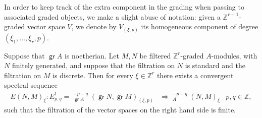 \documentclass[11pt,fleqn]{article}
\newcommand\ZZ{\mathbb Z}
\DeclareMathOperator\GrExt{\underline{\mathsf{Ext}}}
\DeclareMathOperator\gr{\mathsf{gr}}
\begin{document}
In order to keep track of the extra component in the grading when passing to associated 
graded objects, we make a slight abuse of notation: given a $\ZZ^{r+1}$-graded vector 
space $V$, we denote by $V_{(\xi, p)}$ its homogeneous component of degree $(\xi_1, 
\ldots, \xi_r, p)$.

\begin{Proposition*} 
Suppose that $\gr A$ is noetherian.
Let $M, N$ be filtered $\ZZ^r$-graded $A$-modules, with $N$ finitely generated, and
suppose that the filtration on $N$ is standard and the filtration on $M$ is discrete. Then
for every $\xi \in \ZZ^r$ there exists a convergent spectral sequence
\begin{align*} 
  E(N,M)_\xi: E_{p,q}^1 = \GrExt_{\gr A}^{-p-q}(\gr N, \gr M)_{(\xi,p)}
    &\Rightarrow \GrExt_A^{-p-q}(N,M)_\xi 
    &p,q \in \ZZ, 
\end{align*} 
such that the filtration of the vector spaces on the right hand side is finite.
\end{Proposition*}
\end{document}
